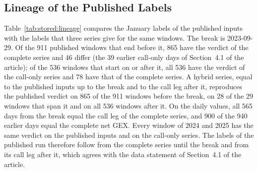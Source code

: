 \subsection{Lineage of the Published Labels}
\label{sup:stored:e13}

Table~\ref{tab:stored:lineage} compares the January labels of the published inputs with the labels that three series give for the same windows. The break is 2023-09-29. Of the 911 published windows that end before it, 865 have the verdict of the complete series and 46 differ (the 39 earlier call-only days of Section~4.1 of the article); of the 536 windows that start on or after it, all 536 have the verdict of the call-only series and 78 have that of the complete series. A hybrid series, equal to the published inputs up to the break and to the call leg after it, reproduces the published verdict on 865 of the 911 windows before the break, on 28 of the 29 windows that span it and on all 536 windows after it. On the daily values, all 565 days from the break equal the call leg of the complete series, and 900 of the 940 earlier days equal the complete net GEX. Every window of 2024 and 2025 has the same verdict on the published inputs and on the call-only series. The labels of the published run therefore follow from the complete series until the break and from its call leg after it, which agrees with the data statement of Section~4.1 of the article.

